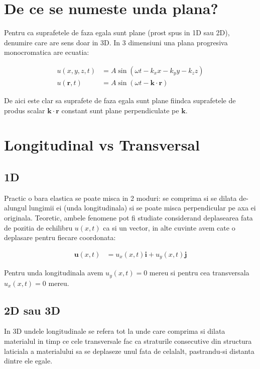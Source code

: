 \documentclass{article}
\newcommand{\vect}{\mathbf}
\begin{document}
\section{De ce se numeste unda plana?}

Pentru ca suprafetele de faza egala sunt plane (prost spus in 1D sau 2D), denumire care are sens doar in 3D. In 3 dimensiuni una plana progresiva monocromatica are ecuatia:

\begin{align*}
    u(x, y, z, t) &= A\sin(\omega t - k_xx - k_yy - k_zz) \\
    u(\vect{r}, t) &= A\sin(\omega t - \vect{k} \cdot \vect{r})
\end{align*}

De aici este clar sa suprafete de faza egala sunt plane fiindca suprafetele de produs scalar $\vect{k} \cdot \vect{r}$ constant sunt plane perpendiculate pe $\vect{k}$.

\section{Longitudinal vs Transversal}

\subsection{1D}

Practic o bara elastica se poate misca in 2 moduri: se comprima si se dilata de-alungul lungimii ei (unda longitudinala) si se poate misca perpendicular pe axa ei originala. Teoretic, ambele fenomene pot fi studiate considerand deplasearea fata de pozitia de echilibru $u(x, t)$ ca si un vector, in alte cuvinte avem cate o deplasare pentru fiecare coordonata:

\begin{align*}
    \vect{u}(x, t) &= u_x(x, t) \vect{i} + u_y(x, t)\vect{j}
\end{align*}

Pentru unda longitudinala avem $u_y(x, t) = 0$ mereu si pentru cea transversala $u_x(x, t) = 0$ mereu.

\subsection{2D sau 3D}

In 3D undele longitudinale se refera tot la unde care comprima si dilata materialul in timp ce cele transversale fac ca straturile consecutive din structura laticiala a materialului sa se deplaseze unul fata de celalalt, pastrandu-si distanta dintre ele egale.
\end{document}
